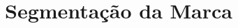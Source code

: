 \documentclass[
	12pt,				%
	openright,			%
	oneside,			%
	a4paper,			%
	english,			%
	french,				%
	spanish,			%
	brazil				%
	]{abntex2}
\begin{document}

\chapter{Segmentação da Marca}




\end{document}
